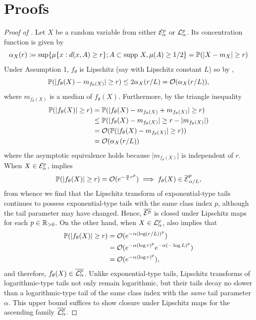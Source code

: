 \documentclass{article}
\theoremstyle{definition}
\theoremstyle{remark}
\begin{document}
\newpage
\appendix

\section{Proofs}
\label{sec:proofs}

\begin{proof}[Proof of ]
  \label{proof:distn_class_closed}
  Let $X$ be a random variable from either $\mathcal{E}_\alpha^p$
  or $\mathcal{L}_\alpha^p$.
  Its concentration function
  \cite[Equation 1.6]{ledoux2001concentration}
  is given by
  \[
    \alpha_X(r)
    \coloneqq \sup \{ \mu\{x : d(x,A) \geq r\}; A \subset \text{supp}~X, \mu(A) \geq 1/2\}
    = \mathbb{P}(\lvert X - m_X \rvert \geq r)
  \]
  Under Assumption 1, $f_\theta$ is Lipschitz (say with Lipschitz
  constant $L$) so by \cite[Proposition 1.3]{ledoux2001concentration},
  \[
    \mathbb{P}(\lvert f_\theta(X) - m_{f_\theta(X)}\rvert \geq r)
    \leq 2 \alpha_X(r/L)
    = \mathcal{O}(\alpha_X(r/L)),
  \]
  where $m_{f_\theta(X)}$ is a median of $f_\theta(X)$.
  Furthermore, by the triangle inequality
  \begin{align}
    \mathbb{P}(\lvert f_\theta(X) \rvert \geq r)
    &= \mathbb{P}(\lvert f_\theta(X) - m_{f_\theta(X)} + m_{f_\theta(X)} \rvert \geq r) \nonumber\\
    &\leq \mathbb{P}(\lvert f_\theta(X) - m_{f_\theta(X)}\rvert \geq r - \lvert m_{f_\theta(X)}\rvert ) \nonumber\\
    &= \mathcal{O}(\mathbb{P}(\lvert f_\theta(X) - m_{f_\theta(X)}\rvert \geq r)) \nonumber\\
    &= \mathcal{O}(\alpha_X(r/L)) \label{eq:pushforward-conc-fn}
  \end{align}
  where the asymptotic equivalence holds because $\lvert m_{f_\theta(X)} \rvert$ is independent of $r$.
  When $X \in \mathcal{E}_\alpha^p$,  implies
  \[
    \mathbb{P}(\lvert f_\theta(X) \rvert \geq r)
    = \mathcal{O}(e^{-\frac{\alpha}{L} r^p}) \implies f_\theta(X) \in \overline{\mathcal{E}}_{\alpha/L}^p,
  \]
  from whence we find that the Lipschitz transform of exponential-type
  tails continues to possess exponential-type tails with the same
  class index $p$, although the tail parameter may have changed. Hence,
  $\overline{\mathcal{E}^p}$ is closed under Lipschitz maps for each $p \in \mathbb{R}_{>0}$.
  On the other hand, when $X \in \mathcal{L}_\alpha^p$,  also implies that
  \begin{align*}
    \mathbb{P}(\lvert f_\theta(X) \rvert \geq r)
    &= \mathcal{O}(e^{-\alpha (\log (r/L))^p}) \\
    &= \mathcal{O}(e^{-\alpha (\log r)^p} e^{-\alpha (-\log L)^p}) \\
    &= \mathcal{O}(e^{-\alpha (\log r)^p}),
  \end{align*}
  and therefore, $f_\theta(X) \in \overline{\mathcal{L}_\alpha^p}$.
  Unlike exponential-type tails, Lipschitz transforms of
  logarithmic-type tails not only remain logarithmic, but
  their tails decay no slower than a logarithmic-type tail
  of the same class index with the \emph{same} tail parameter $\alpha$.
  This upper bound suffices to show closure under Lipschitz maps for the
  ascending family $\overline{\mathcal{L}_\alpha^p}$.
\end{proof}
\end{document}
